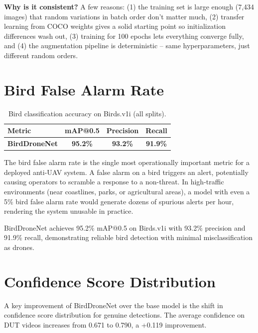 \documentclass[12pt,a4paper]{report}
\renewcommand{\arraystretch}{1.1}
\begin{document}
\textbf{Why is it consistent?} A few reasons: (1) the training set is large
enough (7,434 images) that random variations in batch order don't matter much,
(2) transfer learning from COCO weights gives a solid starting point so
initialization differences wash out, (3) training for 100 epochs lets everything
converge fully, and (4) the augmentation pipeline is deterministic -- same
hyperparameters, just different random orders.

\section{Bird False Alarm Rate}

\begin{table}[H]
\centering
\caption[Bird classification accuracy]{Bird classification accuracy on Birds.v1i (all splits).}
\label{tab:bird_fp}
\renewcommand{\arraystretch}{0.9}
\begin{tabular}{|l|c|c|c|}
\hline
\rowcolor{gray!20}
\textbf{Metric} & \textbf{mAP@0.5} & \textbf{Precision} & \textbf{Recall} \\
\hline
\textbf{BirdDroneNet} & \textbf{95.2\%} & \textbf{93.2\%} & \textbf{91.9\%} \\
\hline
\end{tabular}
\end{table}

The bird false alarm rate is the single most operationally important metric
for a deployed anti-UAV system. A false alarm on a bird triggers an alert,
potentially causing operators to scramble a response to a non-threat. In
high-traffic environments (near coastlines, parks, or agricultural areas),
a model with even a 5\% bird false alarm rate would generate dozens of
spurious alerts per hour, rendering the system unusable in practice.

BirdDroneNet achieves 95.2\% mAP@0.5 on Birds.v1i with
93.2\% precision and 91.9\% recall, demonstrating reliable bird detection
with minimal misclassification as drones.

\section{Confidence Score Distribution}

A key improvement of BirdDroneNet over the base model is the shift in
confidence score distribution for genuine detections. The average confidence
on DUT videos increases from 0.671 to 0.790, a +0.119 improvement.
\end{document}
